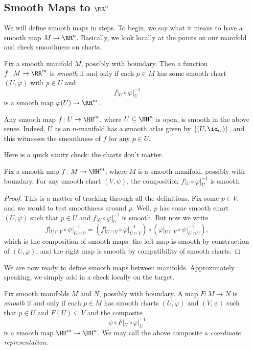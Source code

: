 \documentclass[../notes.tex]{subfiles}
\begin{document}
\subsection{Smooth Maps to \texorpdfstring{$\RR^n$}{ Rn}}
We will define smooth maps in steps. To begin, we say what it means to have a smooth map $M\to\RR^n$. Basically, we look locally at the points on our manifold and check smoothness on charts.
\begin{definition}[smooth]
	Fix a smooth manifold $M$, possibly with boundary. Then a function $f\colon M\to\RR^m$ is \textit{smooth} if and only if each $p\in M$ has some smooth chart $(U,\varphi)$ with $p\in U$ and
	\[f|_U\circ\varphi|_U^{-1}\]
	is a smooth map $\varphi(U)\to\RR^m$.
\end{definition}
\begin{example}
	Any smooth map $f\colon U\to\HH^m$, where $U\subseteq\HH^n$ is open, is smooth in the above sense. Indeed, $U$ as an $n$-manifold has a smooth atlas given by $\{(U,{\id_U})\}$, and this witnesses the smoothness of $f$ for any $p\in U$.
\end{example}
Here is a quick sanity check: the charts don't matter.
\begin{lemma}
	Fix a smooth map $f\colon M\to\HH^m$, where $M$ is a smooth manifold, possibly with boundary. For any smooth chart $(V,\psi)$, the composition $f|_U\circ\varphi|_U^{-1}$ is smooth.
\end{lemma}
\begin{proof}
	This is a matter of tracking through all the definitions. Fix some $p\in V$, and we would to test smoothness around $p$. Well, $p$ has some smooth chart $(U,\varphi)$ such that $p\in U$ and $f|_U\circ\varphi|_U^{-1}$ is smooth. But now we write
	\[f|_{U\cap V}\circ\psi|_{U\cap V}^{-1}=\left(f|_{U\cap V}\circ\varphi|_{U\cap V}^{-1}\right)\circ\left(\varphi|_{U\cap V}\circ\psi|_{U\cap V}^{-1}\right),\]
	which is the composition of smooth maps: the left map is smooth by construction of $(U,\varphi)$, and the right map is smooth by compatibility of smooth charts.
\end{proof}
We are now ready to define smooth maps between manifolds. Approximately speaking, we simply add in a check locally on the target.
\begin{definition}[smooth]
	Fix smooth manifolds $M$ and $N$, possibly with boundary. A map $F\colon M\to N$ is \textit{smooth} if and only if each $p\in M$ has smooth charts $(U,\varphi)$ and $(V,\psi)$ such that $p\in U$ and $F(U)\subseteq V$ and the composite
	\[\psi\circ F|_U\circ\varphi|_U^{-1}\]
	is a smooth map $\HH^m\to\HH^n$. We may call the above composite a \textit{coordinate representation}.
\end{definition}
\end{document}
